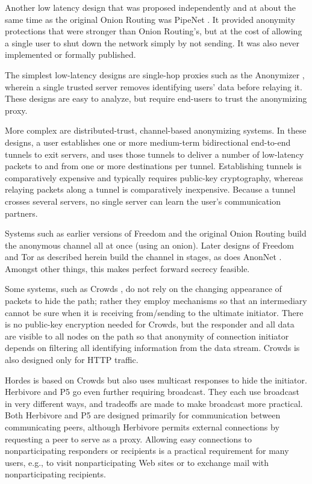 \documentclass[times,10pt,twocolumn]{article}
\begin{document}
Another low latency design that was proposed independently and at
about the same time as the original Onion Routing was PipeNet \cite{pipenet}.
It provided anonymity protections that were stronger than Onion Routing's,
but at the cost of allowing a single user to shut down the network simply
by not sending. It was also never implemented or formally published.

The simplest low-latency designs are single-hop proxies such as the
Anonymizer \cite{anonymizer}, wherein a single trusted server removes
identifying users' data before relaying it.  These designs are easy to
analyze, but require end-users to trust the anonymizing proxy.

More complex are distributed-trust, channel-based anonymizing systems.  In
these designs, a user establishes one or more medium-term bidirectional
end-to-end tunnels to exit servers, and uses those tunnels to deliver a
number of low-latency packets to and from one or more destinations per
tunnel.  Establishing tunnels is comparatively expensive and typically
requires public-key cryptography, whereas relaying packets along a tunnel is
comparatively inexpensive.  Because a tunnel crosses several servers, no
single server can learn the user's communication partners.

Systems such as earlier versions of Freedom and the original Onion Routing
build the anonymous channel all at once (using an onion). 
Later designs of Freedom and Tor as described herein build
the channel in stages, as does AnonNet
\cite{anonnet}. Amongst other things, this makes perfect forward
secrecy feasible.

Some systems, such as Crowds \cite{crowds-tissec}, do not rely on the
changing appearance of packets to hide the path; rather they employ
mechanisms so that an intermediary cannot be sure when it is
receiving from/sending to the ultimate initiator. There is no public-key
encryption needed for Crowds, but the responder and all data are
visible to all nodes on the path so that anonymity of connection
initiator depends on filtering all identifying information from the
data stream. Crowds is also designed only for HTTP traffic.

Hordes \cite{hordes-jcs} is based on Crowds but also uses multicast
responses to hide the initiator. Herbivore \cite{herbivore} and
P5 \cite{p5} go even further requiring broadcast.
They each use broadcast in very different ways, and tradeoffs are made to
make broadcast more practical. Both Herbivore and P5 are designed primarily
for communication between communicating peers, although Herbivore
permits external connections by requesting a peer to serve as a proxy.
Allowing easy connections to nonparticipating responders or recipients
is a practical requirement for many users, e.g., to visit
nonparticipating Web sites or to exchange mail with nonparticipating
recipients.
\end{document}
